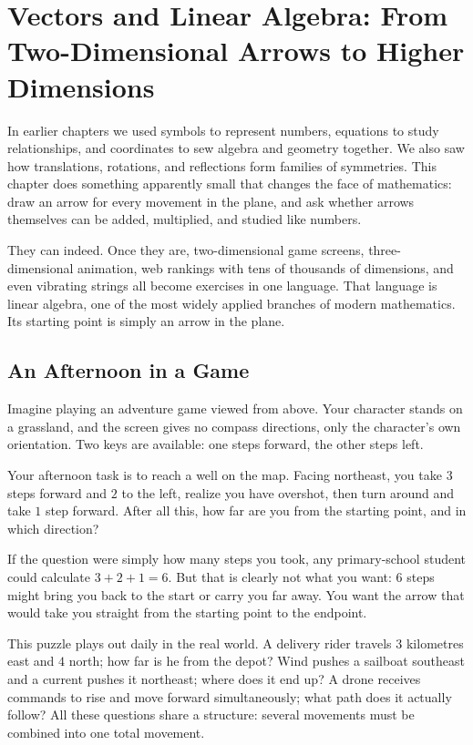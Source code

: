 \chapter{Vectors and Linear Algebra: From Two-Dimensional Arrows to Higher Dimensions}

In earlier chapters we used symbols to represent numbers, equations to study relationships, and coordinates to sew algebra and geometry together. We also saw how translations, rotations, and reflections form families of symmetries. This chapter does something apparently small that changes the face of mathematics: draw an arrow for every movement in the plane, and ask whether arrows themselves can be added, multiplied, and studied like numbers.

They can indeed. Once they are, two-dimensional game screens, three-dimensional animation, web rankings with tens of thousands of dimensions, and even vibrating strings all become exercises in one language. That language is linear algebra, one of the most widely applied branches of modern mathematics. Its starting point is simply an arrow in the plane.

\section{An Afternoon in a Game}

Imagine playing an adventure game viewed from above. Your character stands on a grassland, and the screen gives no compass directions, only the character's own orientation. Two keys are available: one steps forward, the other steps left.

Your afternoon task is to reach a well on the map. Facing northeast, you take $3$ steps forward and $2$ to the left, realize you have overshot, then turn around and take $1$ step forward. After all this, how far are you from the starting point, and in which direction?

If the question were simply how many steps you took, any primary-school student could calculate $3+2+1=6$. But that is clearly not what you want: $6$ steps might bring you back to the start or carry you far away. You want the arrow that would take you straight from the starting point to the endpoint.

This puzzle plays out daily in the real world. A delivery rider travels $3$ kilometres east and $4$ north; how far is he from the depot? Wind pushes a sailboat southeast and a current pushes it northeast; where does it end up? A drone receives commands to rise and move forward simultaneously; what path does it actually follow? All these questions share a structure: several movements must be combined into one total movement.

